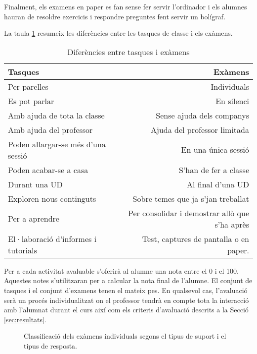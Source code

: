 \documentclass[catalan, a4paper, 12pt, titlepage]{article}
\begin{document}
Finalment, els examens en paper es fan sense fer servir l'ordinador i els alumnes hauran de resoldre exercicis i respondre preguntes fent servir un bolígraf.

La taula \ref{tab:tasquesiexamens} resumeix les diferències entre les tasques de classe i els exàmens.

\begin{table}
        \centering
        \begin{tabular}{lr}
        Tasques & Exàmens\\
        \hline
	Per parelles & Individuals\\
		Es pot parlar & En silenci \\
		Amb ajuda de tota la classe &Sense ajuda dels companys\\
		Amb ajuda del professor & Ajuda del professor limitada\\
		Poden allargar-se més d'una sessió & En una única sessió\\
		Poden acabar-se a casa & S'han de fer a classe\\
		Durant una UD & Al final d'una UD \\
		Exploren nous continguts & Sobre temes que ja s'jan treballat\\
		Per a aprendre & Per consolidar i demostrar allò que s'ha après\\
		El·laboració d'informes i tutorials & Test, captures de pantalla o en paper.

\end{tabular}
        \caption{Diferències entre tasques i exàmens} \label{tab:tasquesiexamens}
\end{table}

Per a cada activitat avaluable s'oferirà al alumne una nota entre el 0 i el 100.
Aquestes notes s'utilitzaran per a calcular la nota final de l'alumne.
El conjunt de tasques i el conjunt d'examens tenen el mateix pes.
En qualsevol cas, l'avaluació serà un procés individualitzat on el professor tendrà en compte tota la interacció amb l'alumnat durant el curs així com els criteris d'avaluació descrits a la Secció \ref{sec:resultats}.

\begin{figure}
\centering
{}
\caption{Classificació dels exàmens individuals segons el tipus de suport i el tipus de resposta.} \label{fig:M1}
\end{figure}
\end{document}
